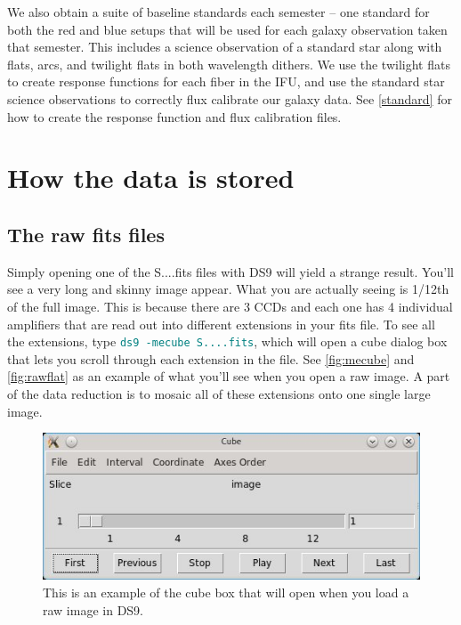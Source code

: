 \documentclass[12pt]{report}
\newcommand{\ty}[1]{\textcolor{teal}{\texttt{#1}}}
\begin{document}
We also obtain a suite of baseline standards each semester -- one standard for both the red and blue setups that will be used for each galaxy observation taken that semester. This includes a science observation of a standard star along with flats, arcs, and twilight flats in both wavelength dithers. We use the twilight flats to create response functions for each fiber in the IFU, and use the standard star science observations to correctly flux calibrate our galaxy data. See \autoref{standard} for how to create the response function and flux calibration files.



\section{How the data is stored}
\subsection{The raw fits files}

Simply opening one of the S....fits files with DS9 will yield a strange result. You'll see a very long and skinny image appear. What you are actually seeing is 1/12th of the full image. This is because there are 3 CCDs and each one has 4 individual amplifiers that are read out into different extensions in your fits file. To see all the extensions, type \ty{ds9 -mecube S....fits}, which will open a cube dialog box that lets you scroll through each extension in the file. See \autoref{fig:mecube} and \autoref{fig:rawflat} as an example of what you'll see when you open a raw image. A part of the data reduction is to mosaic all of these extensions onto one single large image.

\begin{figure}[h]
\centering
\includegraphics{mecube_raw.jpeg}
\caption[Example of DS9 cube diaglog box]{This is an example of the cube box that will open when you load a raw image in DS9.}
\label{fig:mecube}
\end{figure}
\end{document}
